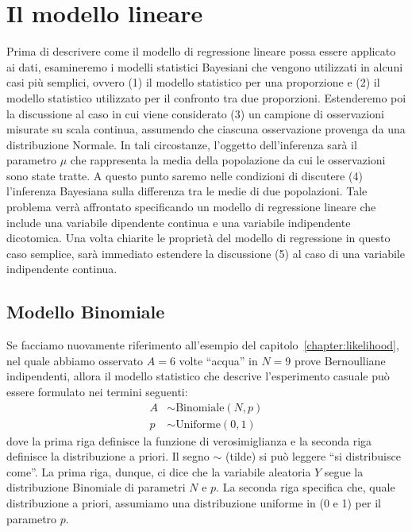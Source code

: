\chapter{Il modello lineare}
\label{chapter:stat_models} 


 
Prima di descrivere come il modello di regressione lineare possa essere applicato ai dati, esamineremo i modelli statistici Bayesiani che vengono utilizzati in alcuni casi più semplici, ovvero (1) il modello statistico per una proporzione e (2) il modello statistico utilizzato per il confronto tra due proporzioni.
Estenderemo poi la discussione al caso in cui viene considerato (3) un campione di osservazioni misurate su scala continua, assumendo che ciascuna osservazione provenga da una distribuzione Normale.
In tali circostanze, l'oggetto dell'inferenza sarà il parametro $\mu$ che rappresenta la media della popolazione da cui le osservazioni sono state tratte.
A questo punto saremo nelle condizioni di discutere (4) l'inferenza Bayesiana sulla differenza tra le medie di due popolazioni.
Tale problema verrà affrontato specificando un modello di regressione lineare che include una variabile dipendente continua e una variabile indipendente dicotomica.
Una volta chiarite le proprietà del modello di regressione in questo caso semplice, sarà immediato estendere la discussione (5) al caso di una variabile indipendente continua.


\section{Modello Binomiale}

Se facciamo nuovamente riferimento all'esempio del capitolo~\ref{chapter:likelihood}, nel quale abbiamo osservato $A = 6$ volte \enquote{acqua} in $N = 9$ prove Bernoulliane indipendenti, allora il modello statistico che descrive l'esperimento casuale può essere formulato nei termini seguenti:
\begin{align}
A &\sim \text{Binomiale}(N, p) \tag*{[verosimiglianza]}\\
p &\sim \text{Uniforme}(0, 1) \tag*{[distr. a priori per $p$]}
\end{align}
dove la prima riga definisce la funzione di verosimiglianza e la seconda riga definisce la distribuzione a priori.
Il segno $\sim$ (tilde) si può leggere \enquote{si distribuisce come}.
La prima riga, dunque, ci dice che la variabile aleatoria $Y$ segue la distribuzione Binomiale di parametri $N$ e $p$.
La seconda riga specifica che, quale distribuzione a priori, assumiamo una distribuzione uniforme in (0 e 1) per il parametro $p$.


